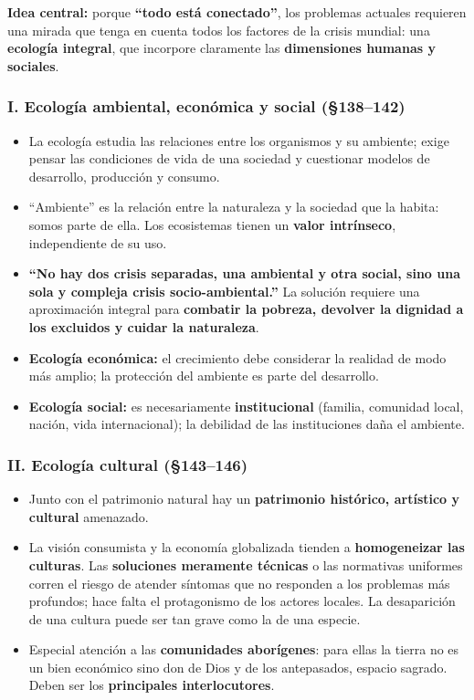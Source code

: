 \documentclass[10pt,a4paper]{article}
\begin{document}
\noindent \textbf{Idea central:} porque \textbf{``todo está conectado''}, los problemas actuales requieren una mirada que tenga en cuenta todos los factores de la crisis mundial: una \textbf{ecología integral}, que incorpore claramente las \textbf{dimensiones humanas y sociales}.\par\smallskip

\subsubsection{I. Ecología ambiental, económica y social (\S{}138--142)}
\begin{itemize}
\item La ecología estudia las relaciones entre los organismos y su ambiente; exige pensar las condiciones de vida de una sociedad y cuestionar modelos de desarrollo, producción y consumo.
\item ``Ambiente'' es la relación entre la naturaleza y la sociedad que la habita: somos parte de ella. Los ecosistemas tienen un \textbf{valor intrínseco}, independiente de su uso.
\item \textbf{``No hay dos crisis separadas, una ambiental y otra social, sino una sola y compleja crisis socio-ambiental.''} La solución requiere una aproximación integral para \textbf{combatir la pobreza, devolver la dignidad a los excluidos y cuidar la naturaleza}.
\item \textbf{Ecología económica:} el crecimiento debe considerar la realidad de modo más amplio; la protección del ambiente es parte del desarrollo.
\item \textbf{Ecología social:} es necesariamente \textbf{institucional} (familia, comunidad local, nación, vida internacional); la debilidad de las instituciones daña el ambiente.
\end{itemize}

\subsubsection{II. Ecología cultural (\S{}143--146)}
\begin{itemize}
\item Junto con el patrimonio natural hay un \textbf{patrimonio histórico, artístico y cultural} amenazado.
\item La visión consumista y la economía globalizada tienden a \textbf{homogeneizar las culturas}. Las \textbf{soluciones meramente técnicas} o las normativas uniformes corren el riesgo de atender síntomas que no responden a los problemas más profundos; hace falta el protagonismo de los actores locales. La desaparición de una cultura puede ser tan grave como la de una especie.
\item Especial atención a las \textbf{comunidades aborígenes}: para ellas la tierra no es un bien económico sino don de Dios y de los antepasados, espacio sagrado. Deben ser los \textbf{principales interlocutores}.
\end{itemize}
\end{document}
